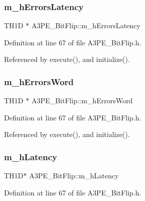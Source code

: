 \subsubsection{\texorpdfstring{m\+\_\+h\+Errors\+Latency}{m\_hErrorsLatency}}
{\footnotesize\ttfamily T\+H1D $\ast$ A3\+P\+E\+\_\+\+Bit\+Flip\+::m\+\_\+h\+Errors\+Latency\hspace{0.3cm}{\ttfamily [private]}}



Definition at line 67 of file A3\+P\+E\+\_\+\+Bit\+Flip.\+h.



Referenced by execute(), and initialize().

\mbox{\label{classA3PE__BitFlip_a0d9ea71af465c060689be4c05cba9a8e}} 
\subsubsection{\texorpdfstring{m\+\_\+h\+Errors\+Word}{m\_hErrorsWord}}
{\footnotesize\ttfamily T\+H1D $\ast$ A3\+P\+E\+\_\+\+Bit\+Flip\+::m\+\_\+h\+Errors\+Word\hspace{0.3cm}{\ttfamily [private]}}



Definition at line 67 of file A3\+P\+E\+\_\+\+Bit\+Flip.\+h.



Referenced by execute(), and initialize().

\mbox{\label{classA3PE__BitFlip_a83928ea28c555c19f4e95cf7863c1b0c}} 
\subsubsection{\texorpdfstring{m\+\_\+h\+Latency}{m\_hLatency}}
{\footnotesize\ttfamily T\+H1D$\ast$ A3\+P\+E\+\_\+\+Bit\+Flip\+::m\+\_\+h\+Latency\hspace{0.3cm}{\ttfamily [private]}}



Definition at line 67 of file A3\+P\+E\+\_\+\+Bit\+Flip.\+h.



